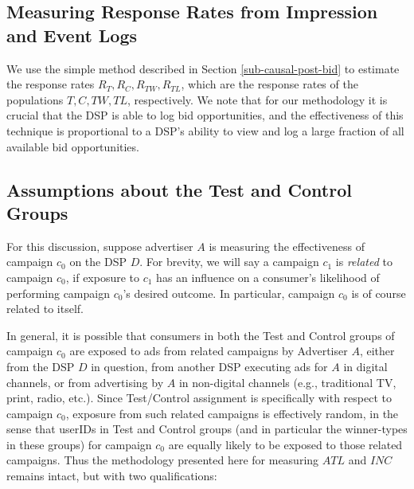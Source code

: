 \documentclass[11pt,a4paper]{article}
\theoremstyle{definition}
\theoremstyle{remark}
\theoremstyle{definition}
\theoremstyle{definition}
\theoremstyle{definition}
\theoremstyle{definition}
\theoremstyle{definition}
\theoremstyle{definition}
\begin{document}
\subsection{Measuring Response Rates from Impression and Event Logs}
We use the simple method described in Section \ref{sub-causal-post-bid} to estimate the response rates   
$R_T, R_C, R_{TW}, R_{TL}$, which are the response rates of the populations $T,C,TW,TL$, respectively. 
We note that for our methodology it is crucial that the DSP is able to log bid opportunities, and the effectiveness of this technique is proportional to a DSP's ability to view and log a large fraction of all available bid opportunities.
 
\subsection{Assumptions about the Test and Control Groups}

For this discussion, suppose advertiser $A$ is measuring the effectiveness of campaign $c_0$ on the DSP $D$. For brevity, we will say a campaign $c_1$ is \textit{related} to campaign $c_0$, if exposure to $c_1$ has an influence on a consumer's likelihood of performing campaign $c_0$'s desired outcome. In particular, campaign $c_0$ is of course related to itself. 

In general, it is possible that consumers in both the Test and Control groups of campaign $c_0$ are exposed to ads from related campaigns by Advertiser $A$, either from the DSP $D$ in question, from another DSP executing ads for $A$ in digital channels, or from advertising by $A$ in non-digital channels (e.g., traditional TV, print, radio, etc.). Since Test/Control assignment is specifically with respect to campaign $c_0$, exposure from such related campaigns is effectively random, in the sense that userIDs in Test and Control groups (and in particular the winner-types in these groups) for campaign $c_0$ are equally likely to be exposed to those related campaigns. Thus the methodology presented here for measuring $ATL$ and $INC$ remains intact, but with two qualifications:
\end{document}
